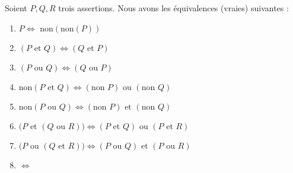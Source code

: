 \documentclass[11pt,class=report,crop=false]{standalone}
\begin{document}
\begin{proposition}
\label{prop:log}
Soient $P, Q, R$ trois assertions.
Nous avons les équivalences (vraies) suivantes :
\begin{enumerate}
  \item \emph{$P \iff \text{ non}(\text{non}(P))$}
  \item \emph{$(P \text{ et } Q) \iff (Q \text{ et } P)$}
  \item \emph{$(P \text{ ou } Q) \iff (Q \text{ ou } P)$}
  \item \emph{$\text{non}(P \text{ et } Q)  \iff  (\text{non } P)  \text{ ou } (\text{non }Q)$}
  \item \emph{$\text{non}(P \text{ ou } Q)  \iff  (\text{non } P)  \text{ et } (\text{non }Q)$}
  \item \emph{$\big(P \text{ et } (Q \text{ ou } R)  \big)   \iff
(P \text{ et } Q) \text{ ou } (P \text{ et }  R)$}
  \item \emph{$\big(P \text{ ou } (Q \text{ et } R)  \big)   \iff
(P \text{ ou } Q) \text{ et } (P \text{ ou }  R)$}
  \item  {}  $\iff$ 
\end{enumerate}
\end{proposition}
\end{document}
